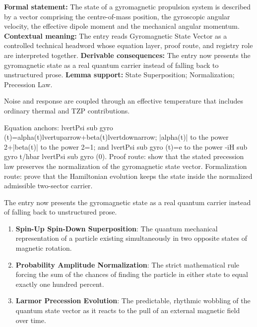 \begingroup\footnotesize\setlength{\emergencystretch}{3em}\sloppy
\textbf{Formal statement:} The state of a gyromagnetic propulsion system is described by a vector comprising the centre-of-mass position, the gyroscopic angular velocity, the effective dipole moment and the mechanical angular momentum. \textbf{Contextual meaning:} The entry reads Gyromagnetic State Vector as a controlled technical headword whose equation layer, proof route, and registry role are interpreted together. \textbf{Derivable consequences:} The entry now presents the gyromagnetic state as a real quantum carrier instead of falling back to unstructured prose. \textbf{Lemma support:} State Superposition; Normalization; Precession Law.\par
\endgroup

Noise and response are coupled through an effective temperature that includes ordinary thermal and TZP contributions.

Equation anchors: lvertPsi sub gyro (t)=alpha(t)lvertuparrow+beta(t)lvertdownarrow; |alpha(t)| to the power 2+|beta(t)| to the power 2=1; and lvertPsi sub gyro (t)=e to the power -iH sub gyro t/hbar lvertPsi sub gyro (0). Proof route: show that the stated precession law preserves the normalization of the gyromagnetic state vector. Formalization route: prove that the Hamiltonian evolution keeps the state inside the normalized admissible two-sector carrier.

The entry now presents the gyromagnetic state as a real quantum carrier instead of falling back to unstructured prose.
\endgroup

\begin{enumerate}[leftmargin=1.6em,itemsep=6pt,topsep=4pt]
\item \textbf{Spin-Up Spin-Down Superposition}: The quantum mechanical representation of a particle existing simultaneously in two opposite states of magnetic rotation.
\item \textbf{Probability Amplitude Normalization}: The strict mathematical rule forcing the sum of the chances of finding the particle in either state to equal exactly one hundred percent.
\item \textbf{Larmor Precession Evolution}: The predictable, rhythmic wobbling of the quantum state vector as it reacts to the pull of an external magnetic field over time.
\end{enumerate}

